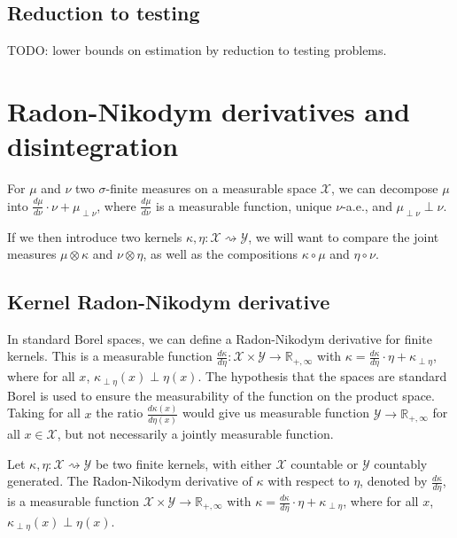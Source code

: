 \section{Reduction to testing}

TODO: lower bounds on estimation by reduction to testing problems.

\chapter{Radon-Nikodym derivatives and disintegration}
\label{app:rnDeriv}

For $\mu$ and $\nu$ two $\sigma$-finite measures on a measurable space $\mathcal{X}$, we can decompose $\mu$ into $\frac{d \mu}{d \nu} \cdot \nu + \mu_{\perp \nu}$, where $\frac{d \mu}{d \nu}$ is a measurable function, unique $\nu$-a.e., and $\mu_{\perp \nu} \perp \nu$.

If we then introduce two kernels $\kappa, \eta : \mathcal X \rightsquigarrow \mathcal Y$, we will want to compare the joint measures $\mu \otimes \kappa$ and $\nu \otimes \eta$, as well as the compositions $\kappa \circ \mu$ and $\eta \circ \nu$.


\section{Kernel Radon-Nikodym derivative}

In standard Borel spaces, we can define a Radon-Nikodym derivative for finite kernels.
This is a measurable function $\frac{d \kappa}{d \eta} : \mathcal X \times \mathcal Y \to \mathbb{R}_{+, \infty}$ with $\kappa = \frac{d \kappa}{d \eta} \cdot \eta + \kappa_{\perp \eta}$, where for all $x$, $\kappa_{\perp \eta}(x) \perp \eta(x)$.
The hypothesis that the spaces are standard Borel is used to ensure the measurability of the function on the product space.
Taking for all $x$ the ratio $\frac{d \kappa(x)}{d \eta(x)}$ would give us measurable function $\mathcal Y \to \mathbb{R}_{+, \infty}$ for all $x \in \mathcal X$, but not necessarily a jointly measurable function.

\begin{definition}
  \label{def:kernel_rnDeriv}
  \mathlibok
  Let $\kappa, \eta : \mathcal X \rightsquigarrow \mathcal Y$ be two finite kernels, with either $\mathcal X$ countable or $\mathcal{Y}$ countably generated. The Radon-Nikodym derivative of $\kappa$ with respect to $\eta$, denoted by $\frac{d \kappa}{d \eta}$, is a measurable function $\mathcal X \times \mathcal Y \to \mathbb{R}_{+, \infty}$ with $\kappa = \frac{d \kappa}{d \eta} \cdot \eta + \kappa_{\perp \eta}$, where for all $x$, $\kappa_{\perp \eta}(x) \perp \eta(x)$.
\end{definition}


